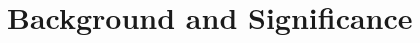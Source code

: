 \documentclass[../Dissertation]{subfiles}
\begin{document}
\section{Background and Significance}
    \lipsum[1-3]
\end{document}
